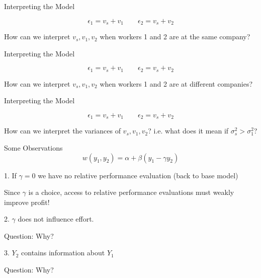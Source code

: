 \documentclass[aspectratio=169,usenames,dvipsnames]{beamer}
\newenvironment{wideitemize}{\itemize\addtolength{\itemsep}{10pt}}{\enditemize}
\begin{document}
\begin{frame}{Interpreting the Model}

\[\epsilon_1= v_s + v_1 \qquad \epsilon_2= v_s + v_2\]

\huge How can we interpret $v_s, v_1, v_2$ when workers 1 and 2 are at the same company?


    
\end{frame}

\begin{frame}{Interpreting the Model}

\[\epsilon_1= v_s + v_1 \qquad \epsilon_2= v_s + v_2\]

\huge How can we interpret $v_s, v_1, v_2$ when workers 1 and 2 are at different companies?
    
\end{frame}

\begin{frame}{Interpreting the Model}

\[\epsilon_1= v_s + v_1 \qquad \epsilon_2= v_s + v_2\]

\huge How can we interpret the variances of $v_s, v_1, v_2$? i.e. what does it mean if $\sigma_s^2>\sigma_1^2$?
\end{frame}

\begin{frame}{Some Observations}
\[w(y_1, y_{2}) = \alpha + \beta (y_1 - \gamma y_2)\]
\begin{wideitemize}
    \item[1.] If $\gamma=0$ we have no relative performance evaluation (back to base model)
    \begin{wideitemize}
        \item Since $\gamma$ is a choice, access to relative performance evaluations must weakly improve profit!
    \end{wideitemize}
    \pause
    \item[2.] $\gamma$ does not influence effort.
    \begin{wideitemize}
        \item Question: Why?
    \end{wideitemize}
    \pause
    \item[3.] $Y_2$ contains information about $Y_1$
    \begin{wideitemize}
        \item Question: Why?
    \end{wideitemize}
\end{wideitemize}
    
\end{frame}
\end{document}
